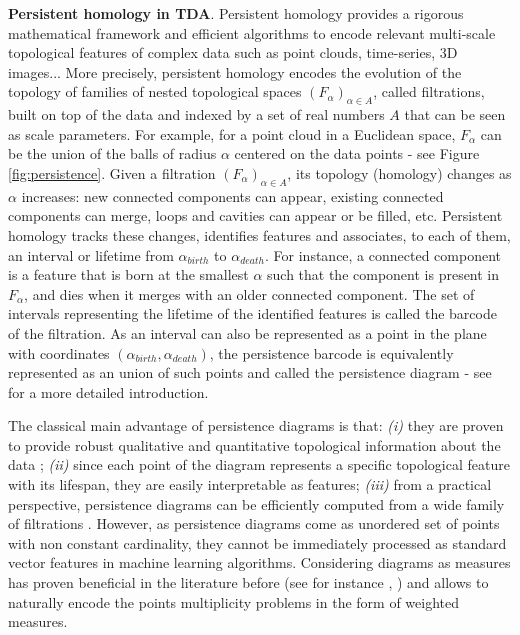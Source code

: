 \documentclass[twoside]{article}
\begin{document}
\textbf{Persistent homology in TDA}. Persistent homology provides a rigorous mathematical framework and efficient
algorithms to encode relevant multi-scale topological features of complex data such as point clouds, time-series, 3D images... More precisely, persistent homology encodes the evolution of the topology of families of nested topological spaces $(F_\alpha)_{\alpha \in A}$, called filtrations,  built on top of the data and indexed by a set of real numbers $A$ that can be seen as scale parameters. For example, for a point cloud in a Euclidean space, $F_\alpha$ can be the union of the balls of radius $\alpha$ centered on the data points - see Figure \ref{fig:persistence}.  Given a filtration $(F_\alpha)_{\alpha \in A}$, its topology (homology) changes as $\alpha$ increases: new connected components
can appear, existing connected components can merge, loops and cavities can appear or be filled, etc. Persistent homology tracks these changes, identifies features and associates, to each of them, an interval or lifetime from $\alpha_{birth}$ to $\alpha_{death}$.
For instance, a connected component is a feature that is born at the smallest $\alpha$ such that the component is present in $F_\alpha$, and dies when it merges with an older connected component. The set of intervals representing the lifetime of the identified features
is called the barcode of the filtration. As an interval can also be represented as a point in the plane with coordinates $(\alpha_{birth}, \alpha_{death})$, the persistence barcode is equivalently represented as an union of such points and called the persistence diagram - see \cite{edelsbrunner2010computational,boissonnat2018geometric} for a more detailed introduction.

The classical main advantage of persistence diagrams is that: {\em (i)} they are proven to provide robust qualitative and quantitative topological information about the data \cite{chazal2012structure}; {\em (ii)} since each point of the diagram represents a specific topological feature with its lifespan, they are easily interpretable as features; {\em (iii)} from a practical perspective, persistence diagrams can be efficiently computed from a wide family of filtrations \cite{gudhi}.
However, as persistence diagrams come as unordered  set of points with non constant cardinality, they cannot be immediately processed as standard vector features in machine learning algorithms. Considering diagrams as measures has proven beneficial in the literature before (see for instance \cite{chazal2012structure}, \cite{chazal2018}) and allows to naturally encode the points multiplicity problems in the form of weighted measures. %
\end{document}
